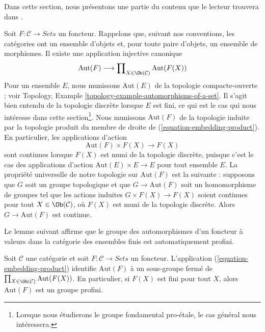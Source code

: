 \noindent
Dans cette section, nous présentons une partie du contenu que le lecteur
trouvera dans \cite[Expos\'e V, Sections 4, 5, and 6]{SGA1}.

\medskip\noindent
Soit $F : \mathcal{C} \to \textit{Sets}$ un foncteur.
Rappelons que, suivant nos conventions, les catégories ont un ensemble
d'objets et, pour toute paire d'objets, un ensemble de morphismes. Il existe
une application injective canonique
\begin{equation}
\label{equation-embedding-product}
\text{Aut}(F)
\longrightarrow
\prod\nolimits_{X \in \Ob(\mathcal{C})} \text{Aut}(F(X))
\end{equation}
Pour un ensemble $E$, nous munissons $\text{Aut}(E)$ de la topologie
compacte-ouverte ; voir Topology, Example
\ref{topology-example-automorphisms-of-a-set}. Il s'agit bien entendu de la
topologie discrète lorsque $E$ est fini, ce qui est le cas qui nous intéresse
dans cette section\footnote{Lorsque nous étudierons le groupe fondamental
pro-étale, le cas général nous intéressera.}. Nous munissons
$\text{Aut}(F)$ de la topologie induite par la topologie produit du membre de
droite de (\ref{equation-embedding-product}). En particulier, les applications
d'action
$$
\text{Aut}(F) \times F(X) \longrightarrow F(X)
$$
sont continues lorsque $F(X)$ est muni de la topologie discrète, puisque
c'est le cas des applications d'action $\text{Aut}(E) \times E \to E$ pour
tout ensemble $E$. La propriété universelle de notre topologie sur
$\text{Aut}(F)$ est la suivante : supposons que $G$ soit un groupe topologique
et que $G \to \text{Aut}(F)$ soit un homomorphisme de groupes tel que les
actions induites $G \times F(X) \to F(X)$ soient continues pour tout
$X \in \Ob(\mathcal{C})$, où $F(X)$ est muni de la topologie discrète.
Alors $G \to \text{Aut}(F)$ est continue.

\medskip\noindent
Le lemme suivant affirme que le groupe des automorphismes d'un foncteur à
valeurs dans la catégorie des ensembles finis est automatiquement profini.

\begin{lemma}
\label{lemma-aut-inverse-limit}
Soit $\mathcal{C}$ une catégorie et soit
$F : \mathcal{C} \to \textit{Sets}$ un foncteur. L'application
(\ref{equation-embedding-product}) identifie $\text{Aut}(F)$ à un sous-groupe
fermé de
$\prod_{X \in \Ob(\mathcal{C})} \text{Aut}(F(X))$.
En particulier, si $F(X)$ est fini pour tout $X$, alors
$\text{Aut}(F)$ est un groupe profini.
\end{lemma}

